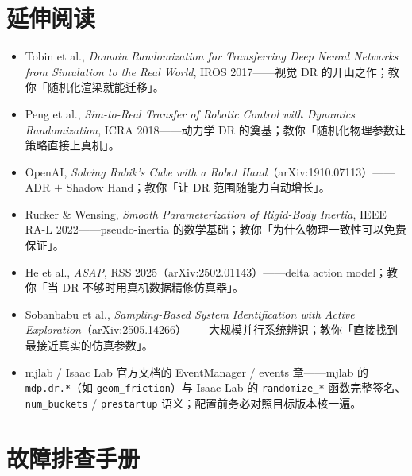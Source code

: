 \section*{延伸阅读}
\label{sec:rlmc-dr-further}

\begin{itemize}
  \item Tobin et al., \emph{Domain Randomization for Transferring Deep Neural Networks from Simulation to the Real World}, IROS 2017\cite{tobin2017dr}——视觉 DR 的开山之作；教你「随机化渲染就能迁移」。
  \item Peng et al., \emph{Sim-to-Real Transfer of Robotic Control with Dynamics Randomization}, ICRA 2018\cite{peng2018simtoreal}——动力学 DR 的奠基；教你「随机化物理参数让策略直接上真机」。
  \item OpenAI, \emph{Solving Rubik's Cube with a Robot Hand}（arXiv:1910.07113）\cite{openai2019rubik}——ADR $+$ Shadow Hand；教你「让 DR 范围随能力自动增长」。
  \item Rucker \& Wensing, \emph{Smooth Parameterization of Rigid-Body Inertia}, IEEE RA-L 2022\cite{rucker2022pseudoinertia}——pseudo-inertia 的数学基础；教你「为什么物理一致性可以免费保证」。
  \item He et al., \emph{ASAP}, RSS 2025（arXiv:2502.01143）\cite{asap2025}——delta action model；教你「当 DR 不够时用真机数据精修仿真器」。
  \item Sobanbabu et al., \emph{Sampling-Based System Identification with Active Exploration}（arXiv:2505.14266）\cite{sobanbabu2025spi}——大规模并行系统辨识；教你「直接找到最接近真实的仿真参数」。
  \item mjlab / Isaac Lab 官方文档的 EventManager / events 章——mjlab 的 \verb|mdp.dr.*|（如 \verb|geom_friction|）与 Isaac Lab 的 \verb|randomize_*| 函数完整签名、\verb|num_buckets| / \verb|prestartup| 语义；配置前务必对照目标版本核一遍。
\end{itemize}

\section*{故障排查手册}
\label{sec:rlmc-dr-trouble}

